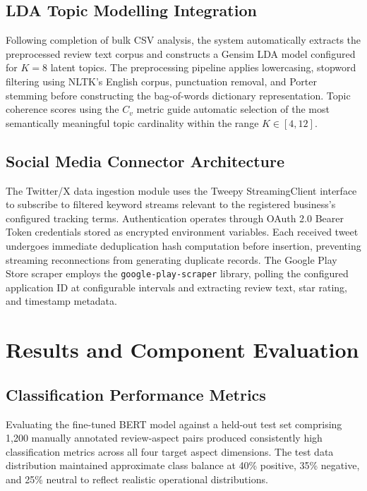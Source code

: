 \documentclass[12pt,a4paper]{report}
\begin{document}
\section{LDA Topic Modelling Integration}
Following completion of bulk CSV analysis, the system automatically extracts the preprocessed review text corpus and constructs a Gensim LDA model configured for $K=8$ latent topics. The preprocessing pipeline applies lowercasing, stopword filtering using NLTK's English corpus, punctuation removal, and Porter stemming before constructing the bag-of-words dictionary representation. Topic coherence scores using the $C_v$ metric guide automatic selection of the most semantically meaningful topic cardinality within the range $K \in [4, 12]$.

\section{Social Media Connector Architecture}
The Twitter/X data ingestion module uses the Tweepy StreamingClient interface to subscribe to filtered keyword streams relevant to the registered business's configured tracking terms. Authentication operates through OAuth 2.0 Bearer Token credentials stored as encrypted environment variables. Each received tweet undergoes immediate deduplication hash computation before insertion, preventing streaming reconnections from generating duplicate records. The Google Play Store scraper employs the \texttt{google-play-scraper} library, polling the configured application ID at configurable intervals and extracting review text, star rating, and timestamp metadata.

\chapter{Results and Component Evaluation}

\section{Classification Performance Metrics}
Evaluating the fine-tuned BERT model against a held-out test set comprising 1,200 manually annotated review-aspect pairs produced consistently high classification metrics across all four target aspect dimensions. The test data distribution maintained approximate class balance at 40\% positive, 35\% negative, and 25\% neutral to reflect realistic operational distributions.
\end{document}
